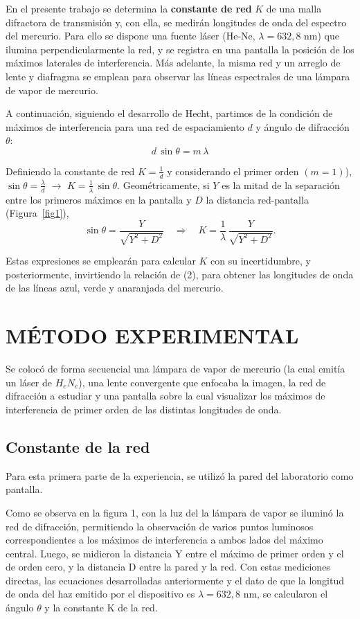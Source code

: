 \documentclass[12pt, a4paper]{article}
\begin{document}
En el presente trabajo se determina la \textbf{constante de red} $K$ de una malla difractora de transmisión y, con ella, se medirán 
longitudes de onda del espectro del mercurio. Para ello se dispone una fuente láser (He-Ne, $\lambda=632,8$ nm) que ilumina 
perpendicularmente la red, y se registra en una pantalla la posición de los máximos laterales de interferencia. Más adelante, la misma red 
y un arreglo de lente y diafragma se emplean para observar las líneas espectrales de una lámpara de vapor de mercurio.

A continuación, siguiendo el desarrollo de Hecht, partimos de la condición de máximos de interferencia para una red de espaciamiento $d$
y ángulo de difracción $\theta$:
\begin{equation}
  d \,\sin\theta = m \,\lambda
\label{equation1}
\end{equation}

Definiendo la constante de red $K = \frac{1}{d}$ y considerando el primer orden $(m=1)$),  
$\sin\theta = \frac{\lambda}{d}$
$\longrightarrow$
$K = \frac{1}{\lambda}\,\sin\theta$.
Geométricamente, si $Y$ es la mitad de la separación entre los primeros máximos en la pantalla y $D$ la distancia red-pantalla 
(Figura~\ref{fig1}),  
\begin{equation}
  \sin\theta = \frac{Y}{\sqrt{Y^2 + D^2}}
  \quad\Longrightarrow\quad
  K = \frac{1}{\lambda}\,\frac{Y}{\sqrt{Y^2 + D^2}}.
\label{equation2}
\end{equation}

Estas expresiones se emplearán para calcular $K$ con su incertidumbre, y posteriormente, invirtiendo la relación de (2), para obtener las 
longitudes de onda de las líneas azul, verde y anaranjada del mercurio.


\section{MÉTODO EXPERIMENTAL}
Se colocó de forma secuencial una lámpara de vapor de mercurio (la cual emitía un láser de $H_{e}N_{e}$), una lente convergente que enfocaba 
la imagen, la red de difracción a estudiar y una pantalla sobre la cual visualizar los máximos de interferencia de primer orden de las 
distintas longitudes de onda.

\subsection{Constante de la red}
Para esta primera parte de la experiencia, se utilizó la pared del laboratorio como pantalla. \par Como se observa en la figura 1, con la 
luz del la lámpara de vapor se iluminó la red de difracción, permitiendo la observación de varios puntos luminosos correspondientes a los 
máximos de interferencia a ambos lados del máximo central. Luego, se midieron la distancia Y entre el máximo de primer orden y el de orden 
cero, y la distancia D entre la pared y la red. Con estas mediciones directas, las ecuaciones desarrolladas anteriormente y el dato de que 
la longitud de onda del haz emitido por el dispositivo es $\lambda = 632,8$ nm, se calcularon el ángulo $\theta$ y la constante K de la red.
\end{document}
